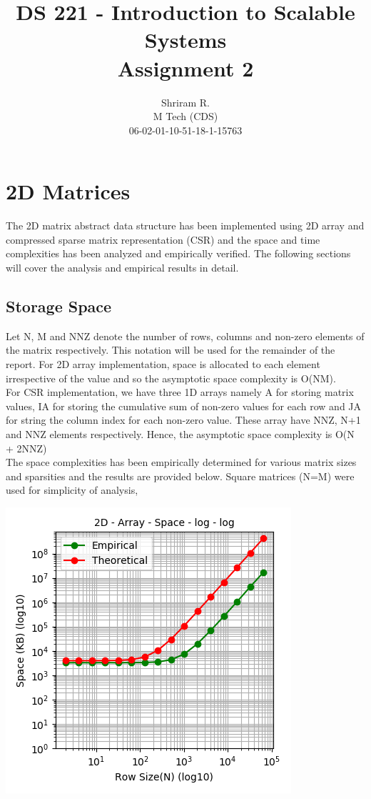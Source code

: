 \documentclass[11pt,a4paper,oneside]{article}
\begin{document}
	\title{DS 221 - Introduction to Scalable Systems \\ Assignment 2}
	\author{Shriram R. \\ M Tech (CDS) \\ 06-02-01-10-51-18-1-15763}
	\maketitle
	
	\section{2D Matrices}
	The 2D matrix abstract data structure has been implemented using 2D array and compressed sparse matrix representation (CSR) and the space and time complexities has been analyzed and empirically verified.
	The following sections will cover the analysis and empirical results in detail.
	
	\subsection{Storage Space}
	Let N, M and NNZ denote the number of rows, columns and non-zero elements of the matrix respectively. This notation will be used for the remainder of the report. For 2D array implementation, space is allocated to each element irrespective of the value and so the asymptotic space complexity is O(NM). \\
	\newline
	For CSR implementation, we have three 1D arrays namely A for storing matrix values, IA for storing the cumulative sum of non-zero values for each row and JA for string the column index for each non-zero value. These array have NNZ, N+1 and NNZ elements respectively. Hence, the asymptotic space complexity is O(N + 2NNZ)  \\
	\newline
	The space complexities has been empirically determined for various matrix sizes and sparsities and the results are provided below. Square matrices (N=M) were used for simplicity of analysis,
	
	\begin{center}
		\includegraphics[scale=0.6]{1.png}		
	\end{center}
\end{document}
